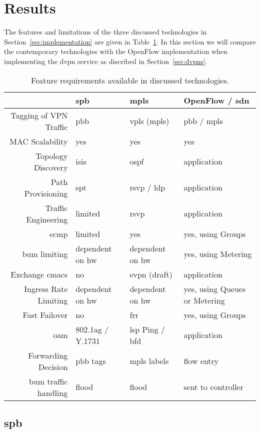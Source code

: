 \section{Results} %
\label{sec:results}

The features and limitations of the three discussed technologies in Section~\ref{sec:implementation} are given in Table~\ref{tb:reqs}. In this section we will compare the contemporary technologies with the OpenFlow implementation when implementing the \ac{dvpn} service as discribed in Section~\ref{sec:dvpns}.

\begin{table}[h]
	\centering
	\begin{tabular}{r|lll}
	 & \acs{spb} & \acs{mpls} & OpenFlow / \acs{sdn}\\
	\hline
	Tagging of VPN Traffic & \acs{pbb} & \acs{vpls} (\acs{mpls}) & \acs{pbb} / \acs{mpls}\\
	MAC Scalability & yes & yes & yes\\
	Topology Discovery & \acs{isis} & \acs{ospf} & application\\
	Path Provisioning & \acs{spt} & \acs{rsvp} / \acs{ldp} & application\\
	Traffic Engineering & limited & \acs{rsvp} & application\\
	\ac{ecmp} & limited & yes & yes, using Groups\\
	\ac{bum} limiting & dependent on \acs{hw} & dependent on \acs{hw} & yes, using Metering\\
	Exchange \acsp{cmac} & no & \ac{evpn} (draft) & application\\
	Ingress Rate Limiting & dependent on \acs{hw} & dependent on \acs{hw} & yes, using Queues or Metering\\
	Fast Failover & no & \acs{frr} & yes, using Groups\\
	\acs{oam} & 802.1ag / Y.1731 & \acs{lsp} Ping / \acs{bfd} & application\\
	\hline
	Forwarding Decision & \acs{pbb} tags & \acs{mpls} labels & flow entry \\
	\ac{bum} traffic handling & flood & flood & sent to controller\\
	\end{tabular}
	\caption{Feature requirements available in discussed technologies.}
	\label{tb:reqs}
\end{table}


\subsection{\acs{spb}} %
\label{sub:r-spb}

